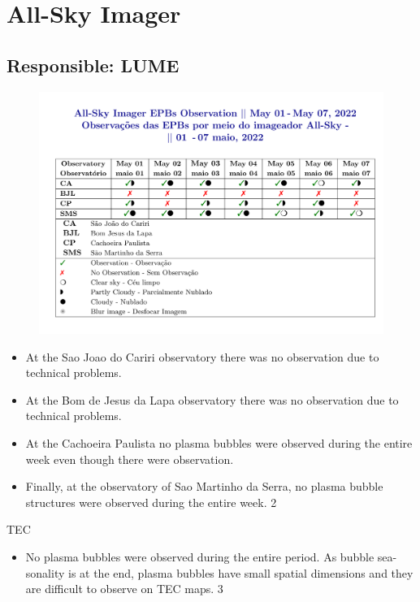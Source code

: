 \documentclass[a4paper, 10pt]{article}
\begin{document}
    \section{All-Sky Imager} 
 \subsection{Responsible: LUME} 
 
\begin{figure}[H]
    
                        \centering
   
                             \includegraphics[width=14cm]{./figures//figureImager_0.png}

                        \end{figure}

                     \begin{itemize} 
 \item  At the Sao Joao do Cariri observatory there was no observation due to technical problems. 
\item  At the Bom de Jesus da Lapa observatory there was no observation due to technical problems. 
\item  At the Cachoeira Paulista no plasma bubbles were observed during the entire week even though there were observation. 
\item  Finally, at the observatory of Sao Martinho da Serra, no plasma bubble structures were observed during the entire week. 2 
\end{itemize} 
 TEC 
\begin{itemize} 
 \item  No plasma bubbles were observed during the entire period. As bubble sea- sonality is at the end, plasma bubbles have small spatial dimensions and they are difficult to observe on TEC maps.  3 
\end{itemize} 
 
\end{document}
